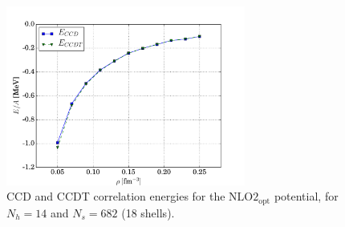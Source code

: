 \documentclass[10pt,twoside]{report}
\begin{document}
	\begin{figure}
		\centering
		\captionsetup{width=.8\textwidth}
		\hspace{0.35cm}
		\includegraphics[width=0.7\textwidth]{Figures/CHIRAL_CCDT_COMPARISON.pdf}
		\caption{CCD and CCDT correlation energies for the $\text{NLO2}_{\text{opt}}$ potential, for $N_h=14$ and $N_s=682$ (18 shells).}
		\label{Results | fig | "CHIRAL CCD CCDT comparison, Nh=14, Nb=18"}
	\end{figure}
	
\end{document}
